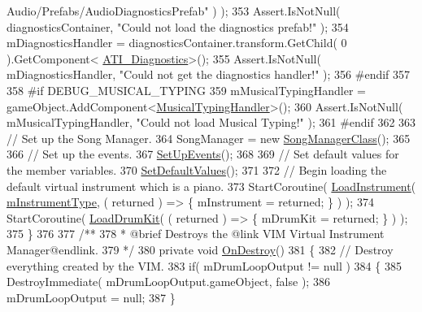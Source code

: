 \begin{DoxyCodeInclude}
{      Audio/Prefabs/AudioDiagnosticsPrefab"} ) );
353             Assert.IsNotNull( diagnosticsContainer, \textcolor{stringliteral}{"Could not load the diagnostics prefab!"} );
354             mDiagnosticsHandler = diagnosticsContainer.transform.GetChild( 0 ).GetComponent<
      \hyperlink{group___audio_testing_class_a_t_i___diagnostics}{ATI\_Diagnostics}>();
355             Assert.IsNotNull( mDiagnosticsHandler, \textcolor{stringliteral}{"Could not get the diagnostics handler!"} );
356 \textcolor{preprocessor}{        #endif}
357 
358 \textcolor{preprocessor}{        #if DEBUG\_MUSICAL\_TYPING}
359             mMusicalTypingHandler = gameObject.AddComponent<\hyperlink{class_musical_typing_handler}{MusicalTypingHandler}>();
360             Assert.IsNotNull( mMusicalTypingHandler, \textcolor{stringliteral}{"Could not load Musical Typing!"} );
361 \textcolor{preprocessor}{        #endif}
362 
363         \textcolor{comment}{// Set up the Song Manager.}
364         SongManager = \textcolor{keyword}{new} \hyperlink{class_song_manager_class}{SongManagerClass}();
365 
366         \textcolor{comment}{// Set up the events.}
367         \hyperlink{group___v_i_m_priv_func_gaa207d18111d38374017c580de4077589}{SetUpEvents}();
368 
369         \textcolor{comment}{// Set default values for the member variables.}
370         \hyperlink{group___v_i_m_priv_func_gaa9e05e51f025afb0ab5cb2a8532c8bba}{SetDefaultValues}();
371 
372         \textcolor{comment}{// Begin loading the default virtual instrument which is a piano.}
373         StartCoroutine( \hyperlink{group___v_i_m_coroutines_gab8082c1cc590771bf57da8b5ae8603d1}{LoadInstrument}( \hyperlink{group___v_i_m_priv_ga108c350257b3a2080e06cd4a8251f6a4}{mInstrumentType}, ( returned ) => \{ 
      mInstrument = returned; \} ) );
374         StartCoroutine( \hyperlink{group___v_i_m_coroutines_gaba165ca4757b6c8555914fe6b42b638d}{LoadDrumKit}( ( returned ) => \{ mDrumKit = returned; \} ) );
375     \}
376 \textcolor{comment}{}
377 \textcolor{comment}{    /**}
378 \textcolor{comment}{     * @brief Destroys the @link VIM Virtual Instrument Manager@endlink.}
379 \textcolor{comment}{    */}
380     \textcolor{keyword}{private} \textcolor{keywordtype}{void} \hyperlink{group___v_i_m_unity_ga87f2b8783dc03eac75819c3ace35f880}{OnDestroy}()
381     \{
382         \textcolor{comment}{// Destroy everything created by the VIM.}
383         \textcolor{keywordflow}{if}( mDrumLoopOutput != null )
384         \{
385             DestroyImmediate( mDrumLoopOutput.gameObject, \textcolor{keyword}{false} );
386             mDrumLoopOutput = null;
387         \}

\end{DoxyCodeInclude}
